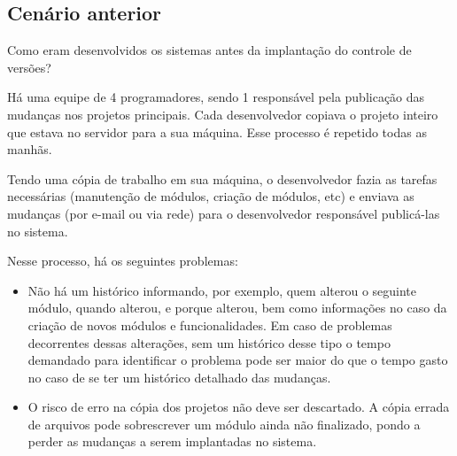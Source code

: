 \subsection{Cenário anterior}

Como eram desenvolvidos os sistemas antes da implantação do controle de versões?

Há uma equipe de 4 programadores, sendo 1 responsável pela publicação das mudanças nos projetos principais. Cada desenvolvedor copiava o projeto inteiro que estava no servidor para a sua máquina. Esse processo é repetido todas as manhãs.

Tendo uma cópia de trabalho em sua máquina, o desenvolvedor fazia as tarefas necessárias (manutenção de módulos, criação de módulos, etc) e enviava as mudanças (por e-mail ou via rede) para o desenvolvedor responsável publicá-las no sistema.

Nesse processo, há os seguintes problemas:

\begin{itemize}
\item Não há um histórico informando, por exemplo, quem alterou o seguinte módulo, quando alterou, e porque alterou, bem como informações no caso da criação de novos módulos e funcionalidades. Em caso de problemas decorrentes dessas alterações, sem um histórico desse tipo o tempo demandado para identificar o problema pode ser maior do que o tempo gasto no caso de se ter um histórico detalhado das mudanças.

\item O risco de erro na cópia dos projetos não deve ser descartado. A cópia errada de arquivos pode sobrescrever um módulo ainda não finalizado, pondo a perder as mudanças a serem implantadas no sistema.
\end{itemize}
